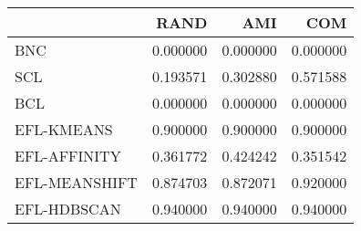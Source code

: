 \begin{tabular}{lrrr}
\toprule
 & RAND & AMI & COM \\
\midrule
BNC & 0.000000 & 0.000000 & 0.000000 \\
SCL & 0.193571 & 0.302880 & 0.571588 \\
BCL & 0.000000 & 0.000000 & 0.000000 \\
EFL-KMEANS & 0.900000 & 0.900000 & 0.900000 \\
EFL-AFFINITY & 0.361772 & 0.424242 & 0.351542 \\
EFL-MEANSHIFT & 0.874703 & 0.872071 & 0.920000 \\
EFL-HDBSCAN & 0.940000 & 0.940000 & 0.940000 \\
\bottomrule
\end{tabular}

